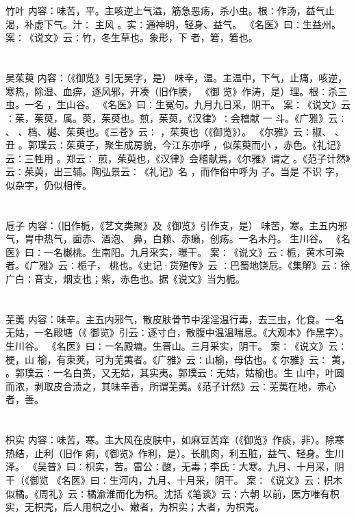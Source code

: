 \documentclass[12pt,UTF8]{ctexbook}
\begin{document}
\section{}竹叶
内容：味苦，平。主咳逆上气溢，筋急恶疡，杀小虫。根∶作汤，益气止渴，补虚下气。汁∶ 
主风 。实∶通神明，轻身、益气。 
《名医》曰∶生益州。 
案∶《说文》云∶竹，冬生草也。象形，下 者，箬，箬也。 


\section{}吴茱萸
内容：（《御览》引无吴字，是） 
味辛，温。主温中，下气，止痛，咳逆，寒热，除湿、血痹，逐风邪，开凑（旧作腠， 
《御 
览》作涛，是）理。根∶杀三虫。一名 ，生山谷。 
《名医》曰∶生冤句。九月九日采，阴干。 
案∶《说文》云∶茱，茱萸，属。萸，茱萸也。煎，茱萸，《汉律》∶会稽献 一 
斗。《广雅》云∶ 、 、档、樾、茱萸也。《三苍》云∶ ，茱萸也（《御览》）。 
《尔雅》云∶椒、 、丑 。郭璞云∶茱萸子，聚生成房貌，今江东亦呼 ，似茱萸而小 
，赤色。《礼记》云∶三牲用 。郑云∶ 煎，茱萸也，《汉律》会稽献焉，《尔雅》谓之 
。《范子计然》云∶茱萸，出三辅。陶弘景云∶《礼记》名 ，而作俗中呼为 子。当是 
不识 字，似杂字，仍似相传。 


\section{}卮子
内容：（旧作栀，《艺文类聚》及《御览》引作支，是） 
味苦，寒。主五内邪气，胃中热气，面赤、酒泡、 鼻，白赖、赤癞，创疡。一名木丹。 
生川谷。 
《名医》曰∶一名樾桃。生南阳。九月采实，曝干。 
案∶《说文》云∶栀，黄木可染者。《广雅》云∶栀子， 桃也。《史记·货殖传》云 
∶巴蜀地饶卮。《集解》云∶徐广白∶音支，烟支也；紫，赤色也。据《说文》当为栀。 


\section{}芜荑
内容：味辛。主五内邪气，散皮肤骨节中淫淫温行毒，去三虫，化食。一名无姑，一名殿塘（《 
御览》引云∶逐寸白，散腹中温温喘息。《大观本》作黑字）。生川谷。 
《名医》曰∶一名殿塘。生晋山。三月采实，阴干。 
案∶《说文》云∶梗，山 榆，有束荚，可为芜荑者。《广雅》云∶山榆，母估也。《 
尔雅》云∶ 荑， 。郭璞云∶一名白蒉，又无姑，其实夷。郭璞云∶无姑，姑榆也。生 
山中，叶圆而浓，剥取皮合渍之，其味辛香，所谓芜荑。《范子计然》云∶芜荑在地，赤心 
者，善。 


\section{}枳实
内容：味苦，寒。主大风在皮肤中，如麻豆苦痒（《御览》作痰，非）。除寒热结，止利（旧作 
痢，《御览》作利，是）。长肌肉，利五脏，益气、轻身。生川泽。 
《吴普》曰∶枳实，苦。雷公∶酸，无毒；李氏∶大寒。九月、十月采，阴干（《御览 
《名医》曰∶生河内，九月、十月采，阴干。 
案∶《说文》云∶枳木似橘。《周礼》云∶橘渝淮而化为枳。沈括《笔谈》云∶六朝 
以前，医方唯有枳实，无枳壳，后人用枳之小、嫩者，为枳实；大者，为枳壳。 
\end{document}
